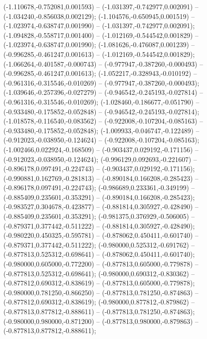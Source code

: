  (-1.110678,-0.752081,0.001593) -- (-1.031397,-0.742977,0.002091) -- (-1.034240,-0.856038,0.002129);
 (-1.104576,-0.650945,0.001519) -- (-1.023974,-0.638747,0.001990) -- (-1.031397,-0.742977,0.002091);
 (-1.094828,-0.558717,0.001400) -- (-1.012169,-0.544542,0.001829) -- (-1.023974,-0.638747,0.001990);
 (-1.081626,-0.476087,0.001239) -- (-0.996285,-0.461247,0.001613) -- (-1.012169,-0.544542,0.001829);
 (-1.066264,-0.401587,-0.000743) -- (-0.977947,-0.387260,-0.000493) -- (-0.996285,-0.461247,0.001613);
 (-1.052217,-0.328943,-0.010192) -- (-0.961316,-0.315546,-0.010269) -- (-0.977947,-0.387260,-0.000493);
 (-1.039646,-0.257396,-0.027279) -- (-0.946542,-0.245193,-0.027814) -- (-0.961316,-0.315546,-0.010269);
 (-1.028460,-0.186677,-0.051790) -- (-0.933480,-0.175852,-0.052848) -- (-0.946542,-0.245193,-0.027814);
 (-1.018578,-0.116540,-0.083562) -- (-0.922008,-0.107204,-0.085163) -- (-0.933480,-0.175852,-0.052848);
 (-1.009933,-0.046747,-0.122489) -- (-0.912023,-0.038950,-0.124624) -- (-0.922008,-0.107204,-0.085163);
 (-1.002466,0.022924,-0.168509) -- (-0.903437,0.029192,-0.171156) -- (-0.912023,-0.038950,-0.124624);
 (-0.996129,0.092693,-0.221607) -- (-0.896178,0.097491,-0.224743) -- (-0.903437,0.029192,-0.171156);
 (-0.990881,0.162769,-0.281813) -- (-0.890184,0.166208,-0.285423) -- (-0.896178,0.097491,-0.224743);
 (-0.986689,0.233361,-0.349199) -- (-0.885409,0.235601,-0.353291) -- (-0.890184,0.166208,-0.285423);
 (-0.983527,0.304678,-0.423877) -- (-0.881814,0.305927,-0.428490) -- (-0.885409,0.235601,-0.353291);
 (-0.981375,0.376929,-0.506005) -- (-0.879371,0.377442,-0.511222) -- (-0.881814,0.305927,-0.428490);
 (-0.980220,0.450325,-0.595781) -- (-0.878062,0.450411,-0.601740) -- (-0.879371,0.377442,-0.511222);
 (-0.980000,0.525312,-0.691762) -- (-0.877813,0.525312,-0.698641) -- (-0.878062,0.450411,-0.601740);
 (-0.980000,0.605000,-0.772200) -- (-0.877813,0.605000,-0.779878) -- (-0.877813,0.525312,-0.698641);
 (-0.980000,0.690312,-0.830362) -- (-0.877812,0.690312,-0.838619) -- (-0.877813,0.605000,-0.779878);
 (-0.980000,0.781250,-0.866250) -- (-0.877813,0.781250,-0.874863) -- (-0.877812,0.690312,-0.838619);
 (-0.980000,0.877812,-0.879862) -- (-0.877813,0.877812,-0.888611) -- (-0.877813,0.781250,-0.874863);
 (-0.980000,0.980000,-0.871200) -- (-0.877813,0.980000,-0.879863) -- (-0.877813,0.877812,-0.888611);
